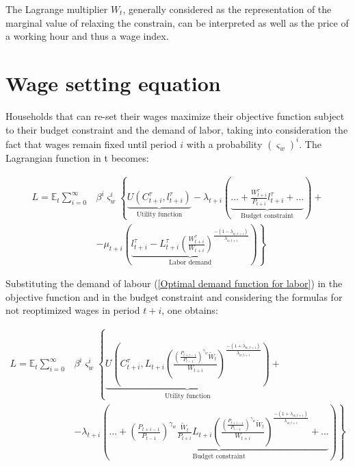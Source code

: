 \documentclass{pracamgr}
\numberwithin{equation}{section}
\begin{document}
The Lagrange multiplier $W_{t}$, generally considered as the representation of the marginal value of relaxing the constrain, can be interpreted as well as the price of a working hour and thus a wage index.

\section*{Wage setting equation}

Households that can re-set their wages maximize their objective function subject to their budget constraint and the demand of labor, taking into consideration the fact that wages remain fixed until period $i$ with a probability $\left( \varsigma_{w} \right)^{i}$. The Lagrangian function in t becomes:

\begin{align}
L = \mathbb{E}_{t} \sum\limits_{i=0}^{\infty} &\beta^{i} \varsigma_{w}^{i} \left\{\underbrace{U \left(C_{t+i}^{\tau}, l_{t+i}^{\tau} \right)}_\text{Utility function} - \lambda_{t+i} \left( \underbrace{\ldots + \frac{W_{t+i}^{\tau}}{P_{t+i}} l_{t+i}^{\tau} + \ldots }_\text{Budget constraint} \right) + \nonumber \right. \\ 
& \left. - \mu_{t+i} \left( \underbrace{l_{t+i}^{\tau} - L_{t+i}^{\tau} \left(\frac{W_{t+i}^{\tau}}{W_{t+i}} \right)^{\frac{-\left(1-\lambda_{w, t+i}\right)}{\lambda_{w, t+i}}}}_\text{Labor demand} \right) \right\}
\end{align}

Substituting the demand of labour (\ref{Optimal demand function for labor}) in the objective function and in the budget constraint and considering the formulas for not reoptimized wages in period $t+i$, one obtains:

\begin{align}
L = \mathbb{E}_{t} \sum\limits_{i=0}^{\infty} &\beta^{i} \varsigma_{w}^{i}  \left\{ \underbrace{U \left(C_{t+i}^{\tau}, L_{t+i} \left( \frac{\left( \frac{P_{t+i-1}}{P_{t-1}} \right)^{\gamma_{w}} \widetilde{W}_{t}}{W_{t+i}}\right)^{\frac{-(1+\lambda_{w,t+i})}{\lambda_{w,t+i}}} \right)}_\text{Utility function} + \right. \nonumber \\
& \left. - \lambda_{t+i} \left( \underbrace{\ldots + \left( \frac{P_{t+i-1}}{P_{t-1}} \right)^{\gamma_{w}} \frac{\widetilde{W}_{t}}{P_{t+i}} L_{t+i} \left( \frac{\left( \frac{P_{t+i-1}}{P_{t-1}} \right)^{\gamma_{w}} \widetilde{W}_{t}}{W_{t+i}}\right)^{\frac{-(1+\lambda_{w,t+i})}{\lambda_{w,t+i}}}
 + \ldots }_\text{Budget constraint} \right) \right\}
\end{align}
\end{document}
